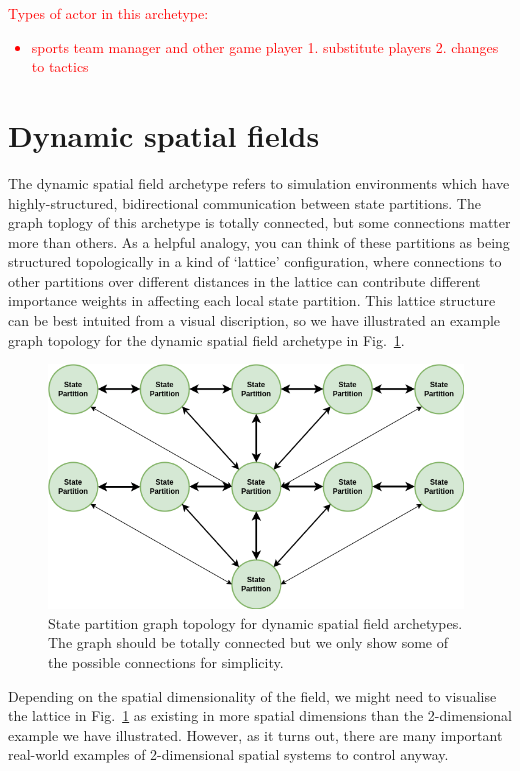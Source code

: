 \textcolor{red}{Types of actor in this archetype:
\begin{itemize}
\item{sports team manager and other game player 1. substitute players 2. changes to tactics}
\end{itemize}}

\section{\sffamily Dynamic spatial fields}

The dynamic spatial field archetype refers to simulation environments which have highly-structured, bidirectional communication between state partitions. The graph toplogy of this archetype is totally connected, but some connections matter more than others. As a helpful analogy, you can think of these partitions as being structured topologically in a kind of `lattice' configuration, where connections to other partitions over different distances in the lattice can contribute different importance weights in affecting each local state partition. This lattice structure can be best intuited from a visual discription, so we have illustrated an example graph topology for the dynamic spatial field archetype in Fig.~\ref{fig:state-partition-graph-dynamic-spatial-fields}.

\begin{figure}[h]
\centering
\includegraphics[width=11cm]{images/chapter-7-state-partition-graph.drawio.png}
\caption{State partition graph topology for dynamic spatial field archetypes. The graph should be totally connected but we only show some of the possible connections for simplicity.}
\label{fig:state-partition-graph-dynamic-spatial-fields}
\end{figure}

Depending on the spatial dimensionality of the field, we might need to visualise the lattice in Fig.~\ref{fig:state-partition-graph-dynamic-spatial-fields} as existing in more spatial dimensions than the 2-dimensional example we have illustrated. However, as it turns out, there are many important real-world examples of 2-dimensional spatial systems to control anyway. 

